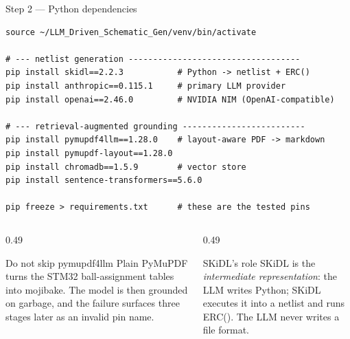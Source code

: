 \documentclass[aspectratio=169,10pt]{beamer}
\newcommand{\code}[1]{{\ttfamily\small #1}}
\begin{document}
\begin{frame}[fragile]{Step 2 --- Python dependencies}
\vspace{-1mm}
\begin{lstlisting}
source ~/LLM_Driven_Schematic_Gen/venv/bin/activate

# --- netlist generation -----------------------------------
pip install skidl==2.2.3           # Python -> netlist + ERC()
pip install anthropic==0.115.1     # primary LLM provider
pip install openai==2.46.0         # NVIDIA NIM (OpenAI-compatible)

# --- retrieval-augmented grounding -------------------------
pip install pymupdf4llm==1.28.0    # layout-aware PDF -> markdown
pip install pymupdf-layout==1.28.0
pip install chromadb==1.5.9        # vector store
pip install sentence-transformers==5.6.0

pip freeze > requirements.txt      # these are the tested pins
\end{lstlisting}
\vspace{-1mm}
\begin{columns}[T]
\begin{column}{0.49\textwidth}
\begin{block}{Do not skip \code{pymupdf4llm}}
\small
Plain PyMuPDF turns the STM32 ball-assignment tables into mojibake. The model is then grounded on garbage, and the failure surfaces three stages later as an invalid pin name.
\end{block}
\end{column}
\begin{column}{0.49\textwidth}
\begin{block}{SKiDL's role}
\small
SKiDL is the \emph{intermediate representation}: the LLM writes Python; SKiDL executes it into a netlist and runs \code{ERC()}. The LLM never writes a file format.
\end{block}
\end{column}
\end{columns}
\end{frame}
\end{document}
